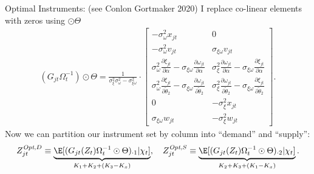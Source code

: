 \begin{frame}{Optimal Instruments: (see Conlon Gortmaker 2020) }
\noindent I replace co-linear elements with zeros using $\odot \Theta$
\begin{align*}
    (G_{jt} \Omega_t^{-1} ) \odot \Theta =  \frac{1}{\sigma_\xi^2 \sigma_\omega^2 - \sigma_{\xi \omega}^2} \cdot 
    \begin{bmatrix}
        -\sigma_\omega^2 x_{jt} & 0  \\
        -\sigma_\omega^2 v_{jt} & \sigma_{\xi \omega} v_{jt} \\
        \sigma_\omega^2 \frac{\partial \xi_{jt}}{\partial \alpha} - 
        \sigma_{\xi\omega}\frac{\partial \omega_{jt}}{\partial \alpha} 
        & \sigma_{\xi}^2 \frac{\partial \omega_{jt}}{\partial \alpha}  - 
        \sigma_{\xi\omega}\frac{\partial \xi_{jt}}{\partial \alpha}  \\
        \sigma_\omega^2 \frac{\partial \xi_{jt}}{\partial \widetilde{\theta}_2}  -
        \sigma_{\xi\omega}\frac{\partial \omega_{jt}}{\partial \widetilde{\theta}_2} 
        & \sigma_{\xi}^2 \frac{\partial \omega_{jt}}{\partial \widetilde{\theta}_2} - 
        \sigma_{\xi\omega}\frac{\partial \xi_{jt}}{\partial \widetilde{\theta}_2}\\
        0 &  -\sigma_{\xi}^2 x_{jt} \\
        \sigma_{\xi\omega} w_{jt} & -\sigma_{\xi}^2 w_{jt}
    \end{bmatrix}
    .
\end{align*}
\noindent Now we can partition our instrument set by column into ``demand'' and ``supply'': 
\begin{align*}
    Z_{jt}^{\textit{Opt},D} \equiv \underbrace{\E[(G_{jt}(Z_t) \Omega_t^{-1} \odot \Theta)_{\cdot 1} | \chi_t]}_{K_1 + K_2 + (K_3 - K_x)}, \quad Z_{jt}^{\textit{Opt},S} \equiv \underbrace{\E[(G_{jt}(Z_t)\Omega_t^{-1} \odot \Theta)_{\cdot 2} | \chi_t]}_{K_2 + K_3+ (K_1 - K_x)}.
\end{align*}
\end{frame}


